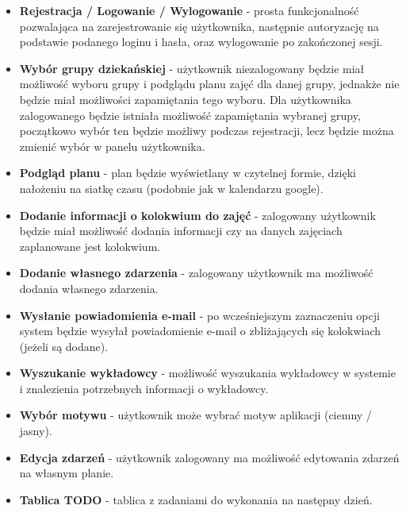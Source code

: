 \documentclass[a4paper,11pt]{uzreport}
\begin{document}
    \begin{itemize}[leftmargin=0.50in]
    
        \item \textbf{Rejestracja / Logowanie / Wylogowanie} - prosta funkcjonalność pozwalająca na zarejestrowanie się użytkownika, następnie autoryzację na 			podstawie podanego loginu i hasła, oraz wylogowanie po zakończonej sesji.
        
        \item \textbf{Wybór grupy dziekańskiej} - użytkownik niezalogowany będzie miał możliwość wyboru grupy i podglądu planu zajęć dla danej grupy, jednakże 			nie będzie miał możliwości zapamiętania tego wyboru. Dla użytkownika zalogowanego będzie istniała możliwość zapamiętania wybranej grupy, początkowo 			wybór ten będzie możliwy podczas rejestracji, lecz będzie można zmienić wybór w panelu użytkownika.
        
        \item \textbf{Podgląd planu} - plan będzie wyświetlany w czytelnej formie, dzięki nałożeniu na siatkę czasu (podobnie jak w kalendarzu google).
        
        \item \textbf{Dodanie informacji o kolokwium do zajęć} - zalogowany użytkownik będzie miał możliwość dodania informacji czy na danych zajęciach 				zaplanowane jest kolokwium.
        
        \item \textbf{Dodanie własnego zdarzenia} - zalogowany użytkownik ma możliwość dodania własnego zdarzenia.
        
        \item \textbf{Wysłanie powiadomienia e-mail} - po wcześniejszym zaznaczeniu opcji system będzie wysyłał powiadomienie e-mail o zbliżających się 				kolokwiach (jeżeli są dodane).
        
        \item \textbf{Wyszukanie wykładowcy} - możliwość wyszukania wykładowcy w systemie i znalezienia potrzebnych informacji o wykładowcy.
        
        \item \textbf{Wybór motywu} - użytkownik może wybrać motyw aplikacji (ciemny / jasny).
        
        \item \textbf{Edycja zdarzeń} - użytkownik zalogowany ma możliwość edytowania zdarzeń na własnym planie.
        
        \item \textbf{Tablica TODO} - tablica z zadaniami do wykonania na następny dzień.
        
    \end{itemize}
\end{document}

